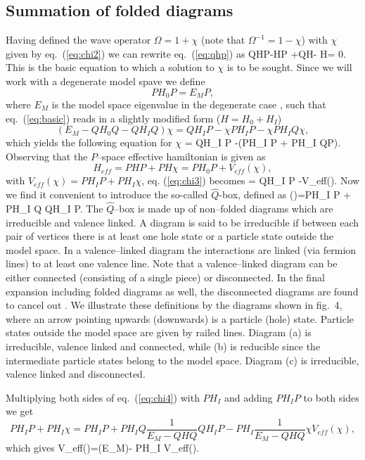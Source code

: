 \subsection{Summation of folded diagrams}
Having defined the wave operator $\Omega = 1 +\chi$ (note that $
\Omega^{-1}=1-\chi$) with
$\chi$ given by eq.\ (\ref{eq:chi2}) we can rewrite
eq.\ (\ref{eq:qhp}) as
\be
QHP-\chi HP +QH\chi - \chi H\chi = 0. \label{eq:basic}
\ee
This is the basic equation to which a solution to $\chi$ is
to be sought.
Since we will work with a degenerate model spave we define
\[
PH_0 P = E_M P,
\]
where $E_M$ is the model space eigenvalue in the degenerate case
, such that eq.\ (\ref{eq:basic}) reads in a slightly modified form
($H=H_0 + H_I$)
\[
(E_M -QH_0 Q -QH_I Q)\chi = QH_I P -\chi PH_I P -\chi PH_I Q\chi,
\]
which yields the following equation for $\chi$
\be
\chi = QH_I P -\chi\left(PH_I P +
PH_I Q\chi P\right).\label{eq:chi3}
\ee
Observing that  the $P$--space effective hamiltonian is given as
\[
H_{eff}= PHP+PH\chi=PH_0 P + V_{eff}(\chi),
\]
with $V_{eff}(\chi)= PH_I P + PH_I\chi$, eq. (\ref{eq:chi3}) becomes
\be
\chi = QH_I P -\chi V_{eff}(\chi ).
\label{eq:chi4}
\ee
Now we find it convenient to introduce the so-called $\hat{Q}$-box,
defined as
\be
{}(\omega)=PH_I P + PH_I Q
QH_I P.\label{eq:qbox}
\ee
The $\hat{Q}$--box is made up of non--folded diagrams which are irreducible
and valence linked. A diagram is said to be irreducible if between each pair
of vertices there is at least one hole state or a particle state outside 
the model space. In a valence--linked diagram the interactions are linked
(via fermion lines) to at least one valence line. Note that a valence--linked
diagram can be either connected (consisting of a single piece) or
disconnected. In the final expansion including folded diagrams as well, the
disconnected diagrams are found to cancel out \cite{ko90}. We illustrate
these definitions by the diagrams shown in fig.\ 4, where an arrow pointing upwards
(downwards) is a particle (hole) state. Particle states outside the model space are given by railed lines. Diagram (a) is irreducible, valence linked and connected, 
while (b) is reducible since the intermediate particle states belong to the model space. Diagram (c) is irreducible, valence linked and disconnected. 



Multiplying both sides of eq.\ (\ref{eq:chi4}) with $PH_I$ and
adding $PH_I P$ to both sides we get
\[
PH_I P + PH_I \chi =
PH_I P + PH_I Q\frac{1}{E_M - QHQ}QH_I P -
PH_I \frac{1}{E_M -QHQ}\chi V_{eff}(\chi ),
\]
which gives
\be
V_{eff}(\chi )=(E_M)-
PH_I \chi V_{eff}(\chi ).
\label{eq:veff}
\ee

